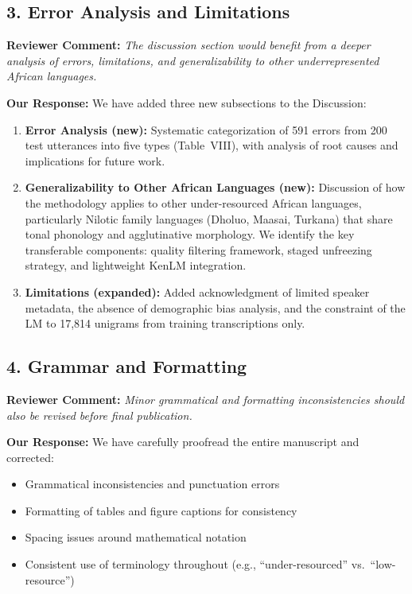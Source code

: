 \documentclass[11pt]{article}
\newcommand{\reviewercomment}[1]{\textcolor{reviewercolor}{\textbf{Reviewer Comment:} \textit{#1}}}
\newcommand{\response}[1]{\textcolor{responsecolor}{\textbf{Our Response:} #1}}
\begin{document}
\subsection*{3. Error Analysis and Limitations}

\reviewercomment{The discussion section would benefit from a deeper analysis of errors, limitations, and generalizability to other underrepresented African languages.}

\response{We have added three new subsections to the Discussion:}

\begin{enumerate}[noitemsep]
    \item \textbf{Error Analysis (new):} Systematic categorization of 591 errors from 200 test utterances into five types (Table~VIII), with analysis of root causes and implications for future work.
    
    \item \textbf{Generalizability to Other African Languages (new):} Discussion of how the methodology applies to other under-resourced African languages, particularly Nilotic family languages (Dholuo, Maasai, Turkana) that share tonal phonology and agglutinative morphology. We identify the key transferable components: quality filtering framework, staged unfreezing strategy, and lightweight KenLM integration.
    
    \item \textbf{Limitations (expanded):} Added acknowledgment of limited speaker metadata, the absence of demographic bias analysis, and the constraint of the LM to 17,814 unigrams from training transcriptions only.
\end{enumerate}

\vspace{1em}

\subsection*{4. Grammar and Formatting}

\reviewercomment{Minor grammatical and formatting inconsistencies should also be revised before final publication.}

\response{We have carefully proofread the entire manuscript and corrected:}
\begin{itemize}[noitemsep]
    \item Grammatical inconsistencies and punctuation errors
    \item Formatting of tables and figure captions for consistency
    \item Spacing issues around mathematical notation
    \item Consistent use of terminology throughout (e.g., ``under-resourced'' vs.\ ``low-resource'')
\end{itemize}
\end{document}
